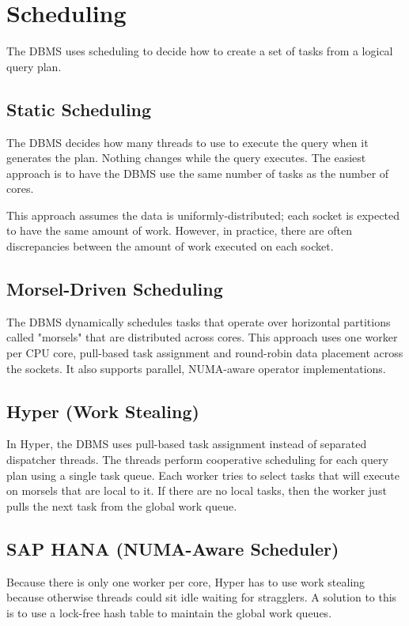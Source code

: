 \documentclass[11pt]{article}
\begin{document}
\section{Scheduling}
The DBMS uses scheduling to decide how to create a set of tasks from a logical query plan.

\subsection*{Static Scheduling}
The DBMS decides how many threads to use to execute the query when it generates the plan. Nothing changes while the query executes. The easiest approach is to have the DBMS use the same number of tasks as the number of cores.

This approach assumes the data is uniformly-distributed; each socket is expected to have the same amount of work. However, in practice, there are often discrepancies between the amount of work executed on each socket.

\subsection*{Morsel-Driven Scheduling~\cite{10.1145/2588555.2610507}}
The DBMS dynamically schedules tasks that operate over horizontal partitions called "morsels" that are distributed across cores. This approach uses one worker per CPU core, pull-based task assignment and round-robin data placement across the sockets. It also supports parallel, NUMA-aware operator implementations.

\subsection*{Hyper (Work Stealing)}
In Hyper, the DBMS uses pull-based task assignment instead of separated dispatcher threads. The threads perform cooperative scheduling for each query plan using a single task queue. Each worker tries to select tasks that will execute on morsels that are local to it. If there are no local tasks, then the worker just pulls the next task from the global work queue.

\subsection*{SAP HANA (NUMA-Aware Scheduler)~\cite{10.14778/2824032.2824043}}
Because there is only one worker per core, Hyper has to use work stealing because otherwise threads could sit idle waiting for stragglers. A solution to this is to use a lock-free hash table to maintain the global work queues.
\end{document}
